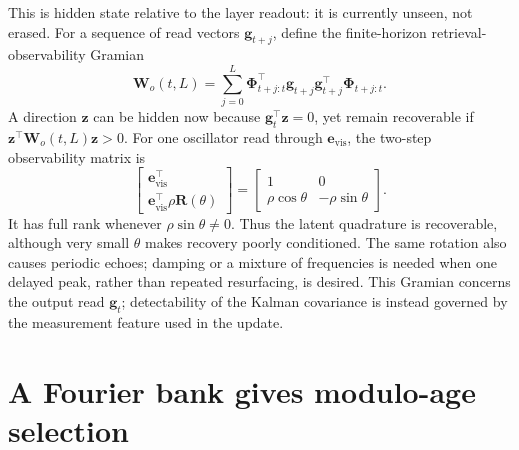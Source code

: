 \documentclass[11pt]{article}
\newcommand{\ve}[1]{\boldsymbol{#1}}
\newcommand{\tr}{\intercal}
\begin{document}
This is hidden state relative to the layer readout: it is currently unseen, not erased. For a
sequence of read vectors $\ve{g}_{t+j}$, define the finite-horizon retrieval-observability
Gramian
\begin{equation}
  \ve{W}_{o}(t,L)
  =\sum_{j=0}^{L}
   \ve{\Phi}_{t+j:t}^{\tr}\ve{g}_{t+j}\ve{g}_{t+j}^{\tr}
   \ve{\Phi}_{t+j:t}.
  \label{eq:observability-gramian}
\end{equation}
A direction $\ve{z}$ can be hidden now because $\ve{g}_t^{\tr}\ve{z}=0$, yet remain
recoverable if $\ve{z}^{\tr}\ve{W}_{o}(t,L)\ve{z}>0$. For one oscillator read through
$\ve{e}_{\mathrm{vis}}$, the two-step observability matrix is
\begin{equation}
  \begin{bmatrix}
    \ve{e}_{\mathrm{vis}}^{\tr}\\
    \ve{e}_{\mathrm{vis}}^{\tr}\rho\ve{R}(\theta)
  \end{bmatrix}
  =
  \begin{bmatrix}
    1&0\\
    \rho\cos\theta&-\rho\sin\theta
  \end{bmatrix}.
\end{equation}
It has full rank whenever $\rho\sin\theta\neq0$. Thus the latent quadrature is recoverable,
although very small $\theta$ makes recovery poorly conditioned. The same rotation also causes
periodic echoes; damping or a mixture of frequencies is needed when one delayed peak, rather
than repeated resurfacing, is desired. This Gramian concerns the output read $\ve{g}_t$;
detectability of the Kalman covariance is instead governed by the measurement feature used in
the update.


\section{A Fourier bank gives modulo-age selection}
\end{document}

